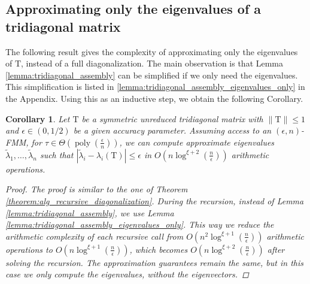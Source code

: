 \documentclass{article}
\newcommand{\lpar}{\left(}
\newcommand{\rpar}{\right)}
\newtheorem{corollary}{Corollary}[section]
\DeclareMathOperator{\poly}{poly}
\newcommand\matT{\boldsymbol{\mathrm{T}}}
\newcommand{\cfmm}{\xi}
\newcommand{\fmmalgo}{FMM} \usepackage[utf8]{inputenc}
\begin{document}
\subsection{Approximating only the eigenvalues of a tridiagonal matrix}
The following result gives the complexity of approximating only the eigenvalues of $\matT$, instead of a full diagonalization. 
The main observation is that Lemma \ref{lemma:tridiagonal_assembly} can be simplified if we only need the eigenvalues. This simplification is listed in \ref{lemma:tridiagonal_assembly_eigenvalues_only} in the Appendix.
Using this as an inductive step, we obtain the following Corollary.
\begin{corollary}
    \label{corollary:tridiagonal_eigenvalues}
    Let $\matT$ be a symmetric unreduced tridiagonal matrix with $\|\matT\|\leq 1$ and $\epsilon\in(0,1/2)$ be a given accuracy parameter. Assuming access to an $(\epsilon,n)$-\fmmalgo, for $\tau\in\Theta(\poly(\tfrac{\epsilon}{n}))$, we can compute approximate eigenvalues $\widetilde\lambda_1,\ldots,\widetilde\lambda_n$ such that
    $|\widetilde\lambda_i-\lambda_i(\matT)|\leq \epsilon$ in $O\lpar n\log^{\cfmm+2}(\tfrac{n}{\epsilon})\rpar$ arithmetic operations.
    \begin{proof}
        The proof is similar to the one of Theorem \ref{theorem:alg_recursive_diagonalization}. During the recursion, instead of Lemma \ref{lemma:tridiagonal_assembly}, we use Lemma \ref{lemma:tridiagonal_assembly_eigenvalues_only}. 
        This way we reduce the arithmetic complexity of each recursive call from $O\lpar n^2\log^{\cfmm+1}(\tfrac{n}{\epsilon})\rpar$
        arithmetic operations 
        to
        $O\lpar n\log^{\cfmm+1}(\tfrac{n}{\epsilon})\rpar$, which becomes
        $O\lpar n\log^{\cfmm+2}(\tfrac{n}{\epsilon})\rpar$ after solving the recursion. The approximation guarantees remain the same, but in this case we only compute the eigenvalues, without the eigenvectors.
    \end{proof}
\end{corollary}
\end{document}
